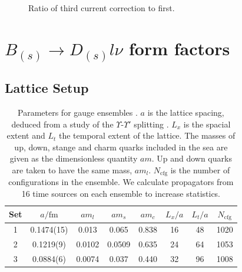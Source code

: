 \begin{figure}
\begin{center}
\end{center}
\label{fig:A3A1}
\caption{Ratio of third current correction to first.}
\end{figure} 

\section{$B_{(s)}\to D_{(s)}l\nu$ form factors}
\label{sec:BD_BsDs_nrqcd}

\subsection{Lattice Setup}

\begin{table}
\begin{center}
 \begin{tabular}{||c c c c c c c c||}
 \hline
 Set & $a/\text{fm}$ & $am_l$ & $am_s$ & $am_c$ & $L_x/a$ & $L_t/a$ & $N_{\text{cfg}}$ \\ [0.5ex] 
 \hline\hline
 1 & 0.1474(15) & 0.013 & 0.065 & 0.838 & 16 & 48 & 1020 \\ [1ex]
 2 & 0.1219(9) & 0.0102 & 0.0509 & 0.635 & 24 & 64 & 1053 \\ [1ex]
 3 & 0.0884(6) & 0.0074 & 0.037 & 0.440 & 32 & 96 & 1008 \\ [1ex]
 \hline
\end{tabular}
\caption{Parameters for gauge ensembles \cite{Bazavov:2012xda}.
$a$ is the lattice spacing, deduced from a study of the
$\Upsilon$-$\Upsilon'$ splitting \cite{Dowdall:2011wh}. $L_x$ is the spacial extent and $L_t$ the
temporal extent of the lattice. The masses of up, down, stange and
charm quarks included in the sea are given as the dimensionless quantity $am$.
Up and down quarks are taken to have the same mass, $am_l$. $N_{\text{cfg}}$ is the number of configurations in the ensemble. We calculate propagators from 16 time sources on each ensemble to increase statistics. \label{tab:nrqcdensembles}}
\end{center}
\end{table}

